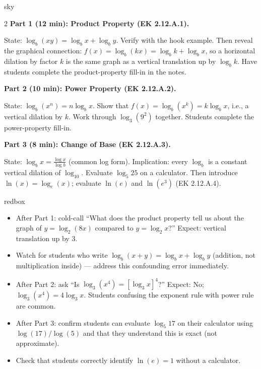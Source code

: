 \documentclass[10pt]{article}
\begin{document}
\begin{skillbox}[Lesson]{sky}
\begin{multicols}{2}
\textbf{Part 1 (12 min): Product Property (EK 2.12.A.1).}

State: $\log_b(xy) = \log_b x + \log_b y$. Verify with the hook example. Then reveal the
graphical connection: $f(x) = \log_b(kx) = \log_b k + \log_b x$, so a horizontal dilation
by factor $k$ is the same graph as a vertical translation up by $\log_b k$. Have students
complete the product-property fill-in in the notes.

\columnbreak

\textbf{Part 2 (10 min): Power Property (EK 2.12.A.2).}

State: $\log_b(x^n) = n\log_b x$. Show that $f(x) = \log_b(x^k) = k\log_b x$, i.e., a
vertical dilation by $k$. Work through $\log_3(9^2)$ together. Students complete the
power-property fill-in.

\textbf{Part 3 (8 min): Change of Base (EK 2.12.A.3).}

State: $\log_b x = \tfrac{\log x}{\log b}$ (common log form). Implication: every
$\log_b$ is a constant vertical dilation of $\log_{10}$. Evaluate $\log_5 25$ on a
calculator. Then introduce $\ln(x) = \log_e(x)$; evaluate $\ln(e)$ and $\ln(e^3)$
(EK 2.12.A.4).
\end{multicols}
\end{skillbox}

\begin{skillbox}{redbox}
\begin{itemize}[leftmargin=1.2em,itemsep=2pt,topsep=0pt]
  \item After Part 1: cold-call ``What does the product property tell us about the graph of
        $y = \log_2(8x)$ compared to $y = \log_2 x$?'' Expect: vertical translation up by 3.
  \item Watch for students who write $\log_b(x + y) = \log_b x + \log_b y$ (addition, not
        multiplication inside) --- address this confounding error immediately.
  \item After Part 2: ask ``Is $\log_3(x^4) = [\log_3 x]^4$?'' Expect: No;
        $\log_3(x^4) = 4\log_3 x$. Students confusing the exponent rule with power rule are
        common.
  \item After Part 3: confirm students can evaluate $\log_5 17$ on their calculator using
        $\log(17)/\log(5)$ and that they understand this is exact (not approximate).
  \item Check that students correctly identify $\ln(e) = 1$ without a calculator.
\end{itemize}
\end{skillbox}
\end{document}
